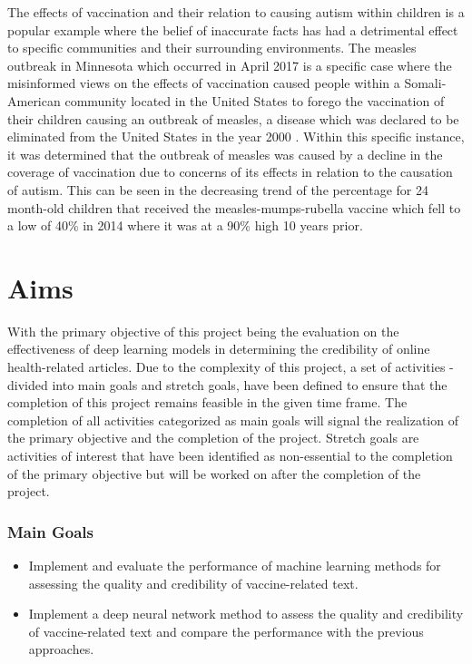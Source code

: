 \documentclass[a4paper,twoside,phd]{BYUPhys}
\begin{document}
The effects of vaccination and their relation to causing autism within children is a popular example where the belief of inaccurate facts has had a detrimental effect to specific communities and their surrounding environments. The measles outbreak in Minnesota which occurred in April 2017 is a specific case where the misinformed views on the effects of vaccination caused people within a Somali-American community located in the United States to forego the vaccination of their children causing an outbreak of measles, a disease which was declared to be eliminated from the United States in the year 2000 \cite{Hall2017}. Within this specific instance, it was determined that the outbreak of measles was caused by a decline in the coverage of vaccination due to concerns of its effects in relation to the causation of autism. This can be seen in the decreasing trend of the percentage for 24 month-old children that received the measles-mumps-rubella vaccine which fell to a low of 40\% in 2014 where it was at a 90\% high 10 years prior.



\section{Aims}
\label{sec:Aims}

With the primary objective of this project being the evaluation on the effectiveness of deep learning models in determining the credibility of online health-related articles. Due to the complexity of this project, a set of activities - divided into main goals and stretch goals, have been defined to ensure that the completion of this project remains feasible in the given time frame. The completion of all activities categorized as main goals will signal the realization of the primary objective and the completion of the project. Stretch goals are activities of interest that have been identified as non-essential to the completion of the primary objective but will be worked on after the completion of the project.

\subsubsection{Main Goals}
\label{sec:MainGoals}
\begin{itemize}
	\item Implement and evaluate the performance of machine learning methods for assessing the quality and credibility of vaccine-related text.
	\item Implement a deep neural network method to assess the quality and credibility of vaccine-related text and compare the performance with the previous approaches.
\end{itemize}
\end{document}
